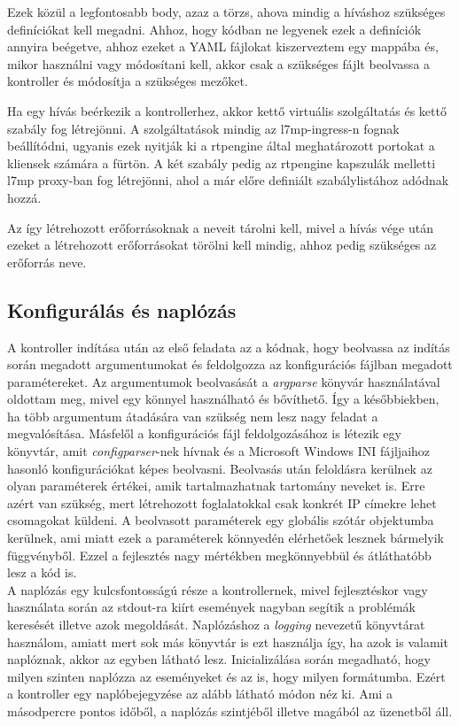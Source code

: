 Ezek közül a legfontosabb body, azaz a törzs, ahova mindig a híváshoz szükséges definíciókat
kell megadni. Ahhoz, hogy kódban ne legyenek ezek a definíciók annyira beégetve, ahhoz
ezeket a YAML fájlokat kiszerveztem egy mappába és, mikor használni vagy módosítani kell,
akkor csak a szükséges fájlt beolvassa a kontroller és módosítja a szükséges mezőket.

Ha egy hívás beérkezik a kontrollerhez, akkor kettő virtuális szolgáltatás és kettő
szabály fog létrejönni. A szolgáltatások mindig az l7mp-ingress-n fognak beállítódni, 
ugyanis ezek nyitják ki a rtpengine által meghatározott portokat a kliensek számára
a fürtön. A két szabály pedig az rtpengine kapszulák melletti l7mp proxy-ban 
fog létrejönni, ahol a már előre definiált szabálylistához adódnak hozzá. 

Az így létrehozott erőforrásoknak a neveit tárolni kell, mivel a hívás vége után ezeket
a létrehozott erőforrásokat törölni kell mindig, ahhoz pedig szükséges az erőforrás 
neve. 

\subsection{Konfigurálás és naplózás}

A kontroller indítása után az első feladata az a kódnak, hogy beolvassa az indítás
során megadott argumentumokat és feldolgozza az konfigurációs fájlban megadott 
paramétereket. Az argumentumok beolvasását a \textit{argparse} \cite{argparse} könyvár használatával
oldottam meg, mivel egy könnyel használható és bővíthető. Így a későbbiekben, ha 
több argumentum átadására van szükség nem lesz nagy feladat a megvalósítása. Másfelől
a konfigurációs fájl feldolgozásához is létezik egy könyvtár, amit \textit{configparser}-nek \cite{configparser}
hívnak és a Microsoft Windows INI fájljaihoz hasonló konfigurációkat képes beolvasni. Beolvasás
után feloldásra kerülnek az olyan paraméterek értékei, amik tartalmazhatnak tartomány neveket
is. Erre azért van szükség, mert létrehozott foglalatokkal csak konkrét IP címekre lehet 
csomagokat küldeni. A beolvasott paraméterek egy globális szótár objektumba kerülnek, ami 
miatt ezek a paraméterek könnyedén elérhetőek lesznek bármelyik függvényből. Ezzel a fejlesztés
nagy mértékben megkönnyebbül és átláthatóbb lesz a kód is. \\

A naplózás egy kulcsfontosságú része a kontrollernek, mivel fejlesztéskor vagy használata
során az stdout-ra kiírt események nagyban segítik a problémák keresését illetve azok 
megoldását. Naplózáshoz a \textit{logging} \cite{logging} nevezetű könyvtárat használom, amiatt mert 
sok más könyvtár is ezt használja így, ha azok is valamit naplóznak, akkor az egyben 
látható lesz. Inicializálása során megadható, hogy milyen szinten naplózza az eseményeket 
és az is, hogy milyen formátumba. Ezért a kontroller egy naplóbejegyzése az alább látható 
módon néz ki. Ami a másodpercre pontos időből, a naplózás szintjéből illetve magából az 
üzenetből áll.

